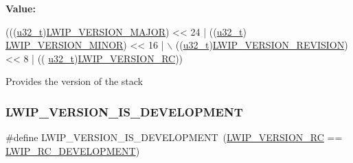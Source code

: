 {\bfseries Value\+:}
\begin{DoxyCode}
(((\hyperlink{group__compiler__abstraction_ga4c14294869aceba3ef9d4c0c302d0f33}{u32\_t})\hyperlink{group__lwip__version_ga4308c06ef36496e00c798d96d7d03246}{LWIP\_VERSION\_MAJOR}) << 24   | ((\hyperlink{group__compiler__abstraction_ga4c14294869aceba3ef9d4c0c302d0f33}{u32\_t})
      \hyperlink{group__lwip__version_ga1e596388c15ba81e753c5633fad1c034}{LWIP\_VERSION\_MINOR}) << 16 | \(\backslash\)
                        ((\hyperlink{group__compiler__abstraction_ga4c14294869aceba3ef9d4c0c302d0f33}{u32\_t})\hyperlink{group__lwip__version_ga0a57983df1b199cf39a2e6a2d90e3d50}{LWIP\_VERSION\_REVISION}) << 8 | ((
      \hyperlink{group__compiler__abstraction_ga4c14294869aceba3ef9d4c0c302d0f33}{u32\_t})\hyperlink{group__lwip__version_gac1dc92d8f453a98560de7e2e00a221a1}{LWIP\_VERSION\_RC}))
\end{DoxyCode}
Provides the version of the stack \mbox{\label{group__lwip__version_ga5ccfb66bcbcf642a64f369ebefa2ad53}} 
\subsubsection{\texorpdfstring{L\+W\+I\+P\+\_\+\+V\+E\+R\+S\+I\+O\+N\+\_\+\+I\+S\+\_\+\+D\+E\+V\+E\+L\+O\+P\+M\+E\+NT}{LWIP\_VERSION\_IS\_DEVELOPMENT}\hspace{0.1cm}{\footnotesize\ttfamily [1/2]}}
{\footnotesize\ttfamily \#define L\+W\+I\+P\+\_\+\+V\+E\+R\+S\+I\+O\+N\+\_\+\+I\+S\+\_\+\+D\+E\+V\+E\+L\+O\+P\+M\+E\+NT~(\hyperlink{group__lwip__version_gac1dc92d8f453a98560de7e2e00a221a1}{L\+W\+I\+P\+\_\+\+V\+E\+R\+S\+I\+O\+N\+\_\+\+RC} == \hyperlink{group__lwip__version_ga9ca69b1a453eb72efd0bbda333f2a33b}{L\+W\+I\+P\+\_\+\+R\+C\+\_\+\+D\+E\+V\+E\+L\+O\+P\+M\+E\+NT})}

\mbox{\label{group__lwip__version_ga5ccfb66bcbcf642a64f369ebefa2ad53}} 
